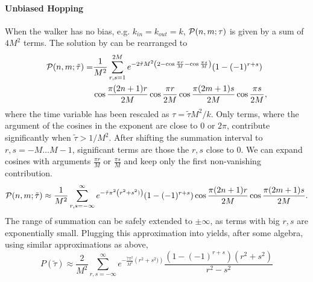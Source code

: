 \paragraph*{Unbiased Hopping}
When the walker has no bias, e.g. $k_{in}=k_{out}=k$,  ${\cal P}(n,m;\tau)$ is given by a sum of $4M^2$ terms. The solution by \citeauthor{Schwarz_75} can be rearranged to 
\begin{equation}
\begin{split}
  {\cal P}(n,m;\tilde\tau)=&\frac{1}{M^2}\sum_{r,s=1}^{2M}e^{-2\tilde\tau M^2\left(2-\cos \frac{\pi r}{M}
-\cos \frac{\pi s}{M}\right)}(1-(-1)^{r+s})\\
&\cos\frac{\pi (2n+1)r}{2M}\cos\frac{\pi r}{2M}\cos\frac{\pi (2m+1)s}{2M}
 \cos\frac{\pi s}{2M},
\end{split}
\end{equation}
where  the time variable has been rescaled as $\tau=\tilde\tau M^2/k$. 
Only terms, where the argument of the cosines in the exponent are close to $0$ or $2\pi$, contribute significantly when $\tilde\tau>1/M^2$. After shifting the summation interval to $r,s=-M\ldots M\!-\!1$, significant terms are those the $r,s$ close to $0$. 
We can expand cosines with arguments $\frac{\pi r}{M}$ or $\frac{\pi s}{M}$ and keep only the first non-vanishing contribution.
\begin{equation}
  {\cal P}(n,m;\tilde\tau)\approx\frac{1}{M^2}\sum_{r,s=-\infty}^{\infty}e^{-\tilde\tau\pi^2\left(r^2+s^2)\right)}(1-(-1)^{r+s})
\cos\frac{\pi (2n+1)r}{2M}\cos\frac{\pi (2m+1)s}{2M}.
\end{equation}
The range of summation can be safely extended to $\pm \infty$, as terms with big $r,s$ are exponentially small.
Plugging this approximation into  yields, after some algebra, using similar approximations as above, 
\begin{equation}
 P(\tilde\tau)\approx\frac{2}{M^2}\sum_{r,s=-\infty}^{\infty}e^{-\frac{\tilde\tau\pi^2}{M^2}\left(r^2+s^2)\right)}\frac{(1-(-1)^{r+s})(r^2+s^2)}{r^2-s^2}
\end{equation}
